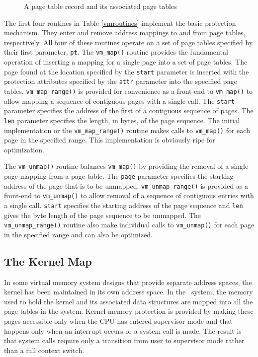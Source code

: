\begin{center}\begin{figure}[h]
\centerline{}
\caption{\label{ptrec} A page table record and its associated
page tables}
\end{figure}\end{center}

The first four routines in Table \ref{vmroutines} implement
the basic protection mechanism.  They enter and remove address
mappings to and from page tables, respectively.  All four of
these routines operate on a set of page tables specified by
their first parameter, {\tt pt}.  The {\tt vm\_map()} routine
provides the fundamental operation of inserting a mapping for
a single page into a set of page tables.  The page found at
the location specified by the {\tt start} parameter is inserted
with the protection attributes specified by the {\tt attr}
parameter into the specified page tables.  {\tt vm\_map\_range()}
is provided for convenience as a front-end to {\tt vm\_map()}
to allow mapping a sequence of contiguous pages with a single
call.  The {\tt start} parameter specifies the address of the
first of a contiguous sequence of pages.  The {\tt len}
parameter specifies the length, in bytes, of the page sequence.
The initial implementation or the {\tt vm\_map\_range()}
routine makes calls to {\tt vm\_map()} for each page in the
specified range.  This implementation is obviously ripe for
optimization.

The {\tt vm\_unmap()} routine balances {\tt vm\_map()} by
providing the removal of a single page mapping from a page
table.  The {\tt page} parameter specifies the starting
address of the page that is to be unmapped.
{\tt vm\_unmap\_range()} is provided as a front-end to
{\tt vm\_unmap()} to allow removal of a sequence of contiguous
entries with a single call.  {\tt start} specifies the starting
address of the page sequence and {\tt len} gives the byte
length of the page sequence to be unmapped.  The
{\tt vm\_unmap\_range()} routine also make individual calls
to {\tt vm\_unmap()} for each page in the specified range
and can also be optimized.


\subsection{The Kernel Map}

In some virtual memory system designs that provide
separate address spaces, the kernel has been maintained
in its own address space.  In the \roadrunner\  system,
the memory used to hold the kernel and its associated data
structures are mapped into all the page tables in the
system.  Kernel memory protection is provided by making
these pages accessible only when the CPU has entered
supervisor mode and that happens only when an interrupt
occurs or a system call is made.  The result is that
system calls require only a transition from user to
supervisor mode rather than a full context switch.

